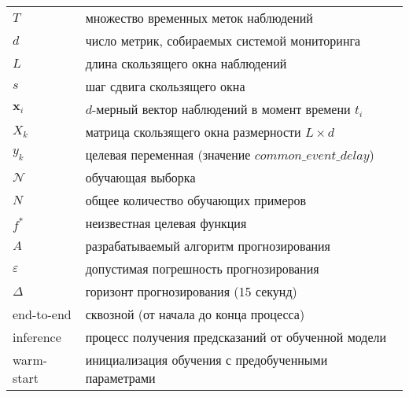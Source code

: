\begin{tabular}{p{} p{}}
$T$ & множество временных меток наблюдений \\
$d$ & число метрик, собираемых системой мониторинга \\
$L$ & длина скользящего окна наблюдений \\
$s$ & шаг сдвига скользящего окна \\
$\mathbf{x}_i$ & $d$-мерный вектор наблюдений в момент времени $t_i$ \\
$X_k$ & матрица скользящего окна размерности $L \times d$ \\
$y_k$ & целевая переменная (значение $common\_event\_delay$) \\
$\mathcal{N}$ & обучающая выборка \\
$N$ & общее количество обучающих примеров \\
$f^*$ & неизвестная целевая функция \\
$A$ & разрабатываемый алгоритм прогнозирования \\
$\varepsilon$ & допустимая погрешность прогнозирования \\
$\Delta$ & горизонт прогнозирования (15 секунд) \\
end-to-end & сквозной (от начала до конца процесса) \\
inference & процесс получения предсказаний от обученной модели \\
warm-start & инициализация обучения с предобученными параметрами \\
\end{tabular}

\newpage 